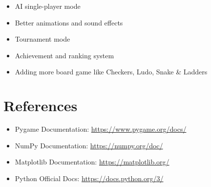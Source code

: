 \documentclass[12pt,a4paper]{article}
\begin{document}
\begin{itemize}
    \item AI single-player mode
    \item Better animations and sound effects
    \item Tournament mode
    \item Achievement and ranking system
    \item Adding more board game like Checkers, Ludo, Snake \& Ladders
\end{itemize}


\section{References}

\begin{itemize}
    \item Pygame Documentation: \url{https://www.pygame.org/docs/}
    \item NumPy Documentation: \url{https://numpy.org/doc/}
    \item Matplotlib Documentation: \url{https://matplotlib.org/}
    \item Python Official Docs: \url{https://docs.python.org/3/}
\end{itemize}
\end{document}
